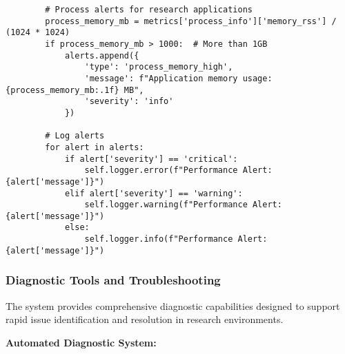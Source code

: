 \documentclass[11pt,a4paper]{article}
\begin{document}
\begin{verbatim}
        # Process alerts for research applications
        process_memory_mb = metrics['process_info']['memory_rss'] / (1024 * 1024)
        if process_memory_mb > 1000:  # More than 1GB
            alerts.append({
                'type': 'process_memory_high',
                'message': f"Application memory usage: {process_memory_mb:.1f} MB",
                'severity': 'info'
            })

        # Log alerts
        for alert in alerts:
            if alert['severity'] == 'critical':
                self.logger.error(f"Performance Alert: {alert['message']}")
            elif alert['severity'] == 'warning':
                self.logger.warning(f"Performance Alert: {alert['message']}")
            else:
                self.logger.info(f"Performance Alert: {alert['message']}")
\end{verbatim}

\subsubsection{Diagnostic Tools and Troubleshooting}

The system provides comprehensive diagnostic capabilities designed to support rapid issue identification and resolution
in research environments.

\textbf{Automated Diagnostic System:}
\end{document}
